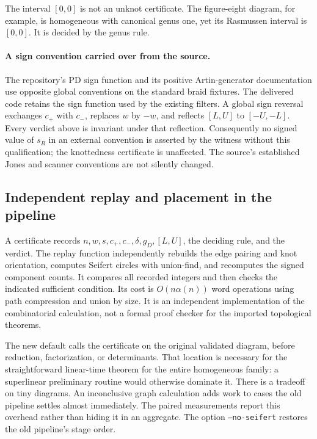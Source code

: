 \documentclass[11pt,letterpaper]{article}
\newcommand{\code}[1]{\texttt{#1}}
\begin{document}
The interval $[0,0]$ is not an unknot certificate. The figure-eight diagram,
for example, is homogeneous with canonical genus one, yet its Rasmussen
interval is $[0,0]$. It is decided by the genus rule.

\paragraph{A sign convention carried over from the source.}
The repository's PD sign function and its positive Artin-generator
documentation use opposite global conventions on the standard braid
fixtures. The delivered code retains the sign function used by the existing
filters. A global sign reversal exchanges $c_+$ with $c_-$, replaces $w$ by
$-w$, and reflects $[L,U]$ to $[-U,-L]$. Every verdict above is invariant
under that reflection. Consequently no signed value of $s_R$ in an external
convention is asserted by the witness without this qualification; the
knottedness certificate is unaffected. The source's established Jones and
scanner conventions are not silently changed.

\subsection{Independent replay and placement in the pipeline}
A certificate records $n,w,s,c_+,c_-,\delta,g_D,[L,U]$, the deciding rule,
and the verdict. The replay function independently rebuilds the edge
pairing and knot orientation, computes Seifert circles with union-find, and
recomputes the signed component counts. It compares all recorded integers
and then checks the indicated sufficient condition. Its cost is
$O(n\alpha(n))$ word operations using path compression and union by size.
It is an independent implementation of the combinatorial calculation, not
a formal proof checker for the imported topological theorems.

The new default calls the certificate on the original validated diagram,
before reduction, factorization, or determinants. That location is necessary
for the straightforward linear-time theorem for the entire homogeneous
family: a superlinear preliminary routine would otherwise dominate it.
There is a tradeoff on tiny diagrams. An inconclusive graph calculation adds
work to cases the old pipeline settles almost immediately. The paired
measurements report this overhead rather than hiding it in an aggregate.
The option \code{--no-seifert} restores the old pipeline's stage order.
\end{document}
